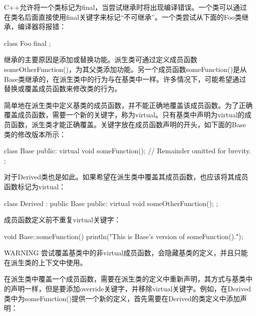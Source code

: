 
C++允许将一个类标记为final，当尝试继承时将出现编译错误。一个类可以通过在类名后面直接使用final关键字来标记“不可继承”。一个类尝试从下面的Foo类继承，编译器将报错：

\begin{cpp}
class Foo final { };
\end{cpp}


继承的主要原因是添加或替换功能。派生类可通过定义成员函数someOtherFunction()，为其父类添加功能。另一个成员函数someFunction()是从Base类继承的，在派生类中的行为与在基类中一样。许多情况下，可能希望通过替换或覆盖成员函数来修改类的行为。


简单地在派生类中定义基类的成员函数，并不能正确地覆盖该成员函数。为了正确覆盖成员函数，需要一个新的关键字，称为virtual。只有基类中声明为virtual的成员函数，派生类才能正确覆盖。关键字放在成员函数声明的开头，如下面的Base类的修改版本所示：

\begin{cpp}
class Base
{
    public:
        virtual void someFunction();
        // Remainder omitted for brevity.
};
\end{cpp}

对于Derived类也是如此。如果希望在派生类中覆盖其成员函数，也应该将其成员函数标记为virtual：

\begin{cpp}
class Derived : public Base
{
    public:
        virtual void someOtherFunction();
};
\end{cpp}

成员函数定义前不重复virtual关键字：

\begin{cpp}
void Base::someFunction()
{
    println("This is Base's version of someFunction().");
}
\end{cpp}

\begin{myWarning}{WARNING}
尝试覆盖基类中的非virtual成员函数，会隐藏基类的定义，并且只能在派生类的上下文中使用。
\end{myWarning}


在派生类中覆盖一个成员函数，需要在派生类的定义中重新声明，其方式与基类中的声明一样，但是要添加override关键字，并移除virtual关键字。例如，在Derived类中为someFunction()提供一个新的定义，首先需要在Derived的类定义中添加声明：

